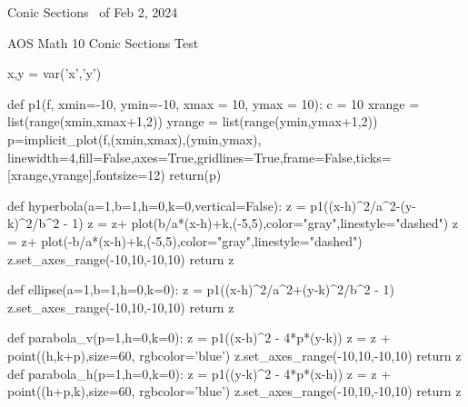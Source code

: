 \documentclass{exam}
\begin{document}
\pagestyle{headandfoot}
\runningheadrule
{}
{Conic Sections \thepage\ of \numpages}
{Feb 2, 2024}

\noindent
{\Large AOS Math 10 Conic Sections Test}
\vspace{2ex}

\noindent
\vspace{5mm}

\noindent
\vspace{5mm}


\newcommand{\tf}[1][{}]{%
\fillin[#1][0.25in]%
}
\newcommand{\hyperbola}[4]{%
	$\dfrac{\sage{(x-#1)^2}}{\sage{#3^2}} - \dfrac{\sage{(y-#2)^2}}{\sage{#4^2}}$
}

\newcommand{\ellipse}[4]{%
	$\dfrac{\sage{(x-#1)^2}}{\sage{#3^2}} + \dfrac{\sage{(y-#2)^2}}{\sage{#4^2}}$
}
\begin{sagesilent}
	x,y = var('x','y')

	def p1(f, xmin=-10, ymin=-10, xmax = 10, ymax = 10):
		  c = 10
		  xrange = list(range(xmin,xmax+1,2))
		  yrange = list(range(ymin,ymax+1,2))
		  p=implicit_plot(f,(xmin,xmax),(ymin,ymax),
			linewidth=4,fill=False,axes=True,gridlines=True,frame=False,ticks=[xrange,yrange],fontsize=12)
		  return(p)

	def hyperbola(a=1,b=1,h=0,k=0,vertical=False):
		  z = p1((x-h)^2/a^2-(y-k)^2/b^2 - 1)
		  z = z+ plot(b/a*(x-h)+k,(-5,5),color="gray",linestyle="dashed")
		  z = z+ plot(-b/a*(x-h)+k,(-5,5),color="gray",linestyle="dashed")
		  z.set_axes_range(-10,10,-10,10)
		  return z

	def ellipse(a=1,b=1,h=0,k=0):
		  z = p1((x-h)^2/a^2+(y-k)^2/b^2 - 1)
		  z.set_axes_range(-10,10,-10,10)
		  return z

	def parabola_v(p=1,h=0,k=0):
		  z = p1((x-h)^2 - 4*p*(y-k))
		  z = z + point((h,k+p),size=60, rgbcolor='blue')
		  z.set_axes_range(-10,10,-10,10)
		  return z
	def parabola_h(p=1,h=0,k=0):
		  z = p1((y-k)^2 - 4*p*(x-h))
		  z = z + point((h+p,k),size=60, rgbcolor='blue')
		  z.set_axes_range(-10,10,-10,10)
		  return z
\end{sagesilent}
\end{document}
